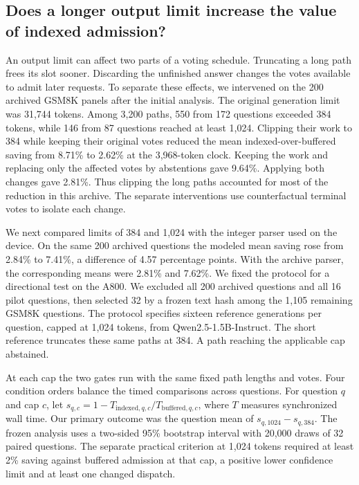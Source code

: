 \subsection{Does a longer output limit increase the value of indexed admission?}\label{sec:cap}
An output limit can affect two parts of a voting schedule. Truncating a long path frees its slot sooner. Discarding the unfinished answer changes the votes available to admit later requests. To separate these effects, we intervened on the 200 archived GSM8K panels after the initial analysis. The original generation limit was 31,744 tokens. Among 3,200 paths, 550 from 172 questions exceeded 384 tokens, while 146 from 87 questions reached at least 1,024. Clipping their work to 384 while keeping their original votes reduced the mean indexed-over-buffered saving from 8.71\% to 2.62\% at the 3,968-token clock. Keeping the work and replacing only the affected votes by abstentions gave 9.64\%. Applying both changes gave 2.81\%. Thus clipping the long paths accounted for most of the reduction in this archive. The separate interventions use counterfactual terminal votes to isolate each change.

We next compared limits of 384 and 1,024 with the integer parser used on the device. On the same 200 archived questions the modeled mean saving rose from 2.84\% to 7.41\%, a difference of 4.57 percentage points. With the archive parser, the corresponding means were 2.81\% and 7.62\%. We fixed the protocol for a directional test on the A800. We excluded all 200 archived questions and all 16 pilot questions, then selected 32 by a frozen text hash among the 1,105 remaining GSM8K questions. The protocol specifies sixteen reference generations per question, capped at 1,024 tokens, from Qwen2.5-1.5B-Instruct. The short reference truncates these same paths at 384. A path reaching the applicable cap abstained.

At each cap the two gates run with the same fixed path lengths and votes. Four condition orders balance the timed comparisons across questions. For question \(q\) and cap \(c\), let \(s_{q,c}=1-T_{\mathrm{indexed},q,c}/T_{\mathrm{buffered},q,c}\), where \(T\) measures synchronized wall time. Our primary outcome was the question mean of \(s_{q,1024}-s_{q,384}\). The frozen analysis uses a two-sided 95\% bootstrap interval with 20,000 draws of 32 paired questions. The separate practical criterion at 1,024 tokens required at least 2\% saving against buffered admission at that cap, a positive lower confidence limit and at least one changed dispatch.

